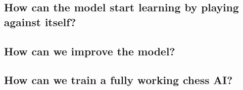 \documentclass[12pt]{article}
\begin{document}
\newpage

\subsection{How can the model start learning by playing against itself?}

\newpage

\subsection{How can we improve the model?}

\newpage

\subsection{How can we train a fully working chess AI?}
\end{document}
